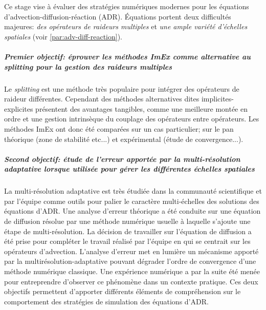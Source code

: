 Ce stage vise à évaluer des stratégies numériques modernes pour les équations d'advection-diffusion-réaction (ADR).
Équations portent deux difficultés majeures: \textit{des opérateurs de raideurs multiples} et \textit{une ample variété d'échelles spatiales} (voir \ref{par:adv-diff-reaction}).
\subparagraph{Premier objectif: éprouver les méthodes ImEx comme alternative au \textit{splitting} pour la gestion des raideurs multiples}
    Le \textit{splitting} est une méthode très populaire pour intégrer des opérateurs de raideur différentes. 
    Cependant des méthodes alternatives dites implicites-explicites présentent des avantages tangibles, comme une meilleure montée en ordre et 
    une gestion intrinsèque du couplage des opérateurs entre opérateurs. 
    Les méthodes ImEx ont donc été comparées sur un cas particulier; sur le pan théorique (zone de stabilité etc...) et expérimental (étude de convergence...).
\subparagraph{Second objectif: étude de l'erreur apportée par la multi-résolution adaptative lorsque utilisée pour gérer les différentes échelles spatiales}
    La multi-résolution adaptative est très étudiée dans la communauté scientifique et par l'équipe comme outils pour palier le caractère multi-échelles des solutions des équations d'ADR.
    Une analyse d'erreur théorique a été conduite sur une équation de diffusion résolue par une méthode numérique usuelle à laquelle s'ajoute une étape de multi-résolution.
    La décision de travailler sur l'équation de diffusion a été prise pour compléter le travail réalisé par l'équipe en \cite{belloti_et_al_2025} qui se centrait sur les opérateurs d'advection.
    L'analyse d'erreur met en lumière un mécanisme apporté par la multirésolution-adaptative pouvant dégrader l'ordre de convergence d'une méthode numérique classique.
    Une expérience numérique a par la suite été menée pour entreprendre d'observer ce phénomène dans un contexte pratique.
Ces deux objectifs permettent d'apporter différents éléments de compréhension sur le comportement des stratégies de simulation des équations d'ADR.